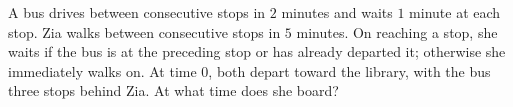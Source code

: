 A bus drives between consecutive stops in $2$ minutes and waits $1$ minute at each stop. Zia walks between consecutive stops in $5$ minutes. On reaching a stop, she waits if the bus is at the preceding stop or has already departed it; otherwise she immediately walks on. At time $0$, both depart toward the library, with the bus three stops behind Zia. At what time does she board?
